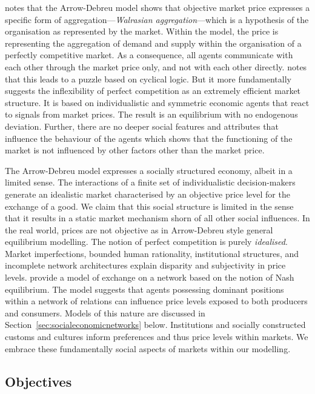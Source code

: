 
\medskip\noindent \citet[p.~5]{Gilles1990} notes that the Arrow-Debreu model shows that objective market price expresses a specific form of aggregation---\emph{Walrasian aggregation}---which is a hypothesis of the organisation as represented by the market. Within the model, the price is representing the aggregation of demand and supply within the organisation of a perfectly competitive market. As a consequence, all agents communicate with each other through the market price only, and not with each other directly. \citet{GillesDiamantaras2003} notes that this leads to a puzzle based on cyclical logic. But it more fundamentally suggests the inflexibility of perfect competition as an extremely efficient market structure. It is based on individualistic and symmetric economic agents that react to signals from market prices. The result is an equilibrium with no endogenous deviation. Further, there are no deeper social features and attributes that influence the behaviour of the agents which shows that the functioning of the market is not influenced by other factors other than the market price.

The Arrow-Debreu model expresses a socially structured economy, albeit in a limited sense. The interactions of a finite set of individualistic decision-makers generate an idealistic market characterised by an objective price level for the exchange of a good. We claim that this social structure is limited in the sense that it results in a static market mechanism shorn of all other social influences. In the real world, prices are not objective as in Arrow-Debreu style general equilibrium modelling. The notion of perfect competition is purely \emph{idealised}. Market imperfections, bounded human rationality, institutional structures, and incomplete network architectures explain disparity and subjectivity in price levels. \citet{Blume2009} provide a model of exchange on a network based on the notion of Nash equilibrium. The model suggests that agents possessing dominant positions within a network of relations can influence price levels exposed to both producers and consumers. Models of this nature are discussed in Section~\ref{sec:socialeconomicnetworks} below. Institutions and socially constructed customs and cultures inform preferences and thus price levels within markets. We embrace these fundamentally social aspects of markets within our modelling.

\subsection{Objectives}

